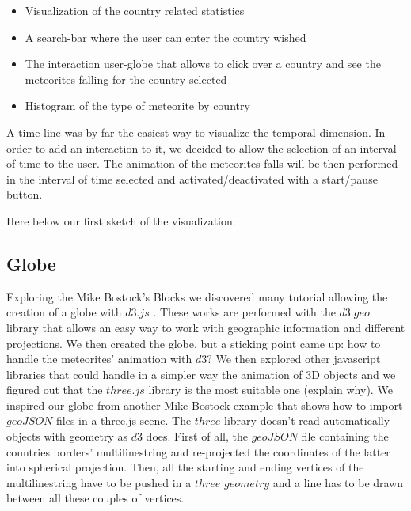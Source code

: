 \documentclass[10pt,conference,compsocconf]{IEEEtran}
\begin{document}
\begin{itemize}
\item Visualization of the country related statistics
\item A search-bar where the user can enter the country wished
\item The interaction user-globe that allows to click over a country and see the meteorites falling for the country selected 
\item Histogram of the type of meteorite by country
\end{itemize}

A time-line was by far the easiest way to visualize the temporal dimension. In order to add an interaction to it, we decided to allow the selection of an interval of time to the user. The animation of the meteorites falls will be then performed in the interval of time selected and activated/deactivated with a start/pause button. 

Here below our first sketch of the visualization:

\subsection{Globe}
Exploring the Mike Bostock's Blocks \cite{bostock_mike_nodate} we discovered many tutorial allowing the creation of a globe with $d3.js$ \cite{bostock_see-through_nodate,bostock_globe_nodate}.  These works are performed with the $d3.geo$ library that allows an easy way to work with geographic information and different projections.
We then created the globe, but a sticking point came up: how to handle the meteorites' animation with $d3$? 
We then explored other javascript libraries that could handle in a simpler way the animation of 3D objects and we figured out that the $three.js$ library \cite{BibEntry2017Nov} is the most suitable one (explain why). 
We inspired our globe from another Mike Bostock example \cite{BibEntry2017Aug} that shows how to import $geoJSON$ files in a three.js scene. The $three$ library doesn't read automatically objects with geometry as $d3$ does. First of all, the $geoJSON$ file containing the countries borders' multilinestring \cite{countryfile} and re-projected the coordinates of the latter into spherical projection. Then, all the starting and ending vertices of the multilinestring have to be pushed in a $three$ $geometry$ and a line has to be drawn between all these couples of vertices.
\end{document}
